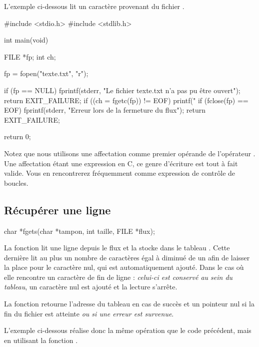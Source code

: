 L'exemple ci-dessous lit un caractère provenant du fichier
.

\begin{C}
#include <stdio.h>
#include <stdlib.h>


int main(void)
{
    FILE *fp;
    int ch;

    fp = fopen("texte.txt", "r");

    if (fp == NULL)
    {
        fprintf(stderr, "Le fichier texte.txt n'a pas pu être ouvert\n");
        return EXIT_FAILURE;
    }
    if ((ch = fgetc(fp)) != EOF)
        printf("%
    if (fclose(fp) == EOF)
    {
        fprintf(stderr, "Erreur lors de la fermeture du flux\n");
        return EXIT_FAILURE;        
    }

    return 0;
}
\end{C}

\begin{infobox}
  Notez que nous utilisons une
affectation comme premier opérande de l'opérateur \mybox{!=}. Une
affectation étant une expression en C, ce genre d'écriture est tout à
fait valide. Vous en rencontrerez fréquemment comme expression de
contrôle de boucles.
\end{infobox}


\subsection{Récupérer une ligne}
\label{recuperer-une-ligne}

\begin{C}
char *fgets(char *tampon, int taille, FILE *flux);
\end{C}

La fonction  lit une ligne depuis le flux 
et la stocke dans le tableau . Cette dernière lit au plus
un nombre de caractères égal à  diminué de un afin de
laisser la place pour le caractère nul, qui est automatiquement ajouté.
Dans le cas où elle rencontre un caractère de fin de ligne :
\emph{celui-ci est conservé au sein du tableau}, un caractère nul est
ajouté et la lecture s'arrête.

La fonction retourne l'adresse du tableau  en cas de
succès et un pointeur nul si la fin du fichier est atteinte \emph{ou si
une erreur est survenue}.

L'exemple ci-dessous réalise donc la même opération que le code
précédent, mais en utilisant la fonction .

